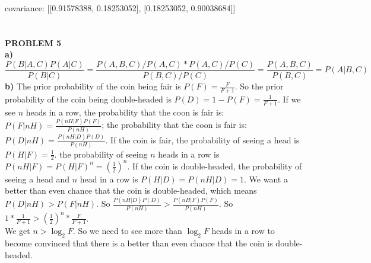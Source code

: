 \documentclass[11pt,a4paper,fleqn]{article}
\begin{document}
\indent covariance: [[0.91578388, 0.18253052], [0.18253052, 0.90038684]] \\
\\
\\
\textbf{PROBLEM 5}\\
\textbf{a)}
$$\frac{P(B|A,C)P(A|C)}{P(B|C)}=\frac{P(A,B,C)/P(A,C)*P(A,C)/P(C)}{P(B,C)/P(C)}=\frac{P(A,B,C)}{P(B,C)}=P(A|B,C)$$
\textbf{b)}
The prior probability of the coin being fair is $P(F)=\frac{F}{F+1}$. So the prior probability of the coin being double-headed is $P(D) = 1 - P(F) = \frac{1}{F+1}$. If we see $n$ heads in a row, the probability that the coon is fair is: $P(F|nH) = \frac{P(nH|F)P(F)}{P(nH)}$;  the probability that the coon is fair is: $P(D|nH) = \frac{P(nH|D)P(D)}{P(nH)}$. If the coin is fair, the probability of seeing a head is $P(H|F) = \frac{1}{2}$. the probability of seeing $n$ heads in a row is $P(nH|F) = P(H|F)^n = (\frac{1}{2})^n$. If the coin is double-headed, the probability of seeing a head and $n$ head in a row is $P(H|D)=P(nH|D)=1$. We want a better than even chance that the coin is double-headed, which means $P(D|nH)>P(F|nH)$. So $\frac{P(nH|D)P(D)}{P(nH)}>\frac{P(nH|F)P(F)}{P(nH)}$. So $1*\frac{1}{F+1}>(\frac{1}{2})^n*\frac{F}{F+1}$.\\
We get $n > \log_2F$. So we need to see more than  $\log_2F$ heads in a row to become convinced that there is a better than even chance that the coin is double-headed.\\
\end{document}
